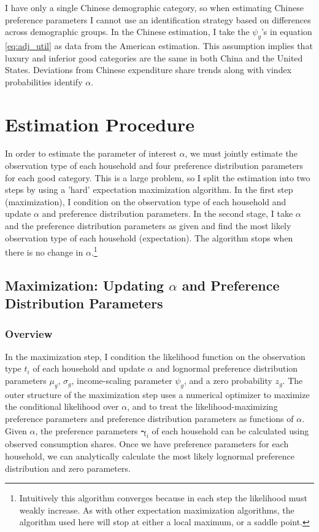 \documentclass[12pt]{article}
\begin{document}
I have only a single Chinese demographic category, so when estimating Chinese preference parameters I cannot use an identification strategy based on differences across demographic groups.  In the Chinese estimation, I take the $\psi_g$'s in equation \eqref{eq:adj_util} as data from the American estimation.  This assumption implies that luxury and inferior good categories are the same in both China and the United States.  Deviations from Chinese expenditure share trends along with vindex probabilities identify $\alpha$.

\section{Estimation Procedure} 


In order to estimate the parameter of interest $\alpha$, we must jointly estimate the observation type of each household and four preference distribution parameters for each good category.  This is a large problem, so I split the estimation into two steps by using a 'hard' expectation maximization algorithm.  In the first step (maximization), I condition on the observation type of each household and update $\alpha$ and preference distribution parameters.  In the second stage, I take $\alpha$ and the preference distribution parameters as given and find the most likely observation type of each household (expectation).  The algorithm stops when there is no change in $\alpha$.\footnote{Intuitively this algorithm converges because in each step the likelihood must weakly increase.  As with other expectation maximization algorithms, the algorithm used here will stop at either a local maximum, or a saddle point.} 

\subsection{Maximization: Updating $\alpha$ and Preference Distribution Parameters} 

\subsubsection{Overview}
In the maximization step, I condition the likelihood function on the observation type $t_i$ of each household and update $\alpha$ and lognormal preference distribution parameters $\mu_g$, $\sigma_g$, income-scaling parameter $\psi_g$, and a zero probability $z_g$.  The outer structure of the maximization step uses a numerical optimizer to maximize the conditional likelihood over $\alpha$, and to treat the likelihood-maximizing preference parameters and preference distribution parameters as functions of $\alpha$.  Given $\alpha$, the preference parameters $\boldsymbol{\gamma}_i$ of each household can be calculated using observed consumption shares.  Once we have preference parameters for each household, we can analytically calculate the most likely lognormal preference distribution and zero parameters.
\end{document}
